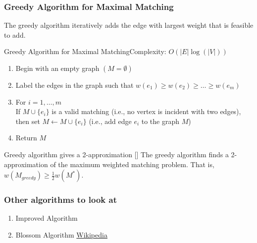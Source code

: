 \subsubsection{Greedy Algorithm for Maximal Matching}
The greedy algorithm iteratively adds the edge with largest weight that is feasible to add.  
\begin{general}{Greedy Algorithm for Maximal Matching}{Complexity: $O(|E|\log(|V|))$}
\label{alg:greedy-matching}
\begin{enumerate}
\item Begin with an empty graph $(M = \emptyset)$
\item Label the edges in the graph such that $w(e_1) \geq w(e_2) \geq \dots \geq w(e_m)$
\item For $i=1, \dots, m$\\
\indent  If $M \cup\{e_i\}$ is a valid matching (i.e., no vertex is incident with two edges), then set $M \leftarrow M \cup \{e_i\}$ (i.e., add edge $e_i$ to the graph $M$)
\item Return $M$
\end{enumerate}
\end{general}

\begin{theorem}{Greedy algorithm gives a 2-approximation [\cite{Avis83}]}{}
The greedy algorithm finds a 2-approximation of the maximum weighted matching problem.  That is, $w(M_{greedy}) \geq \tfrac{1}{2} w(M^*)$.
\end{theorem}


\subsubsection{Other algorithms to look at}
\begin{enumerate}
\item Improved  Algorithm \cite{DRAKE2003211}
\item Blossom Algorithm \href{https://en.wikipedia.org/wiki/Blossom_algorithm}{Wikipedia}
\end{enumerate}



